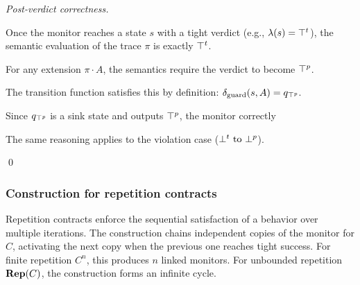       

      \smallskip

      \emph{Post-verdict correctness.}

      Once the monitor reaches a state $s$ with a tight verdict (e.g., $\lambda(s)=\top^t$), the semantic evaluation of the trace $\pi$ is exactly $\top^t$.

      For any extension $\pi \cdot A$, the semantics require the verdict to become $\top^p$.

      The transition function satisfies this by definition: $\delta_{\text{guard}}(s, A) = q_{\top^p}$.

      Since $q_{\top^p}$ is a sink state and outputs $\top^p$, the monitor correctly 

      The same reasoning applies to the violation case ($\bot^t \text{ to } \bot^p$).

      \qed







\subsubsection*{Construction for repetition contracts}

Repetition contracts enforce the sequential satisfaction of a behavior over multiple iterations. The construction chains independent copies of the monitor for $C$, activating the next copy when the previous one reaches tight success. For finite repetition $C^n$, this produces $n$ linked monitors. For unbounded repetition $\mathbf{Rep}(C)$, the construction forms an infinite cycle.

